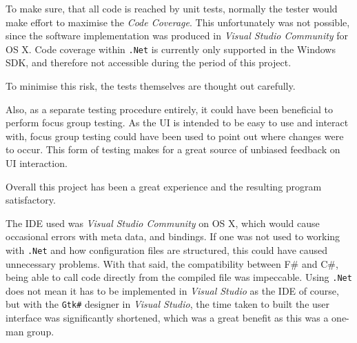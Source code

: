 To make sure, that all code is reached by unit tests, normally the tester would make effort to maximise the \textit{Code Coverage}. This unfortunately was not possible, since the software implementation was produced in \textit{Visual Studio Community} for OS X. Code coverage within \texttt{.Net} is currently only supported in the Windows SDK, and therefore not accessible during the period of this project. 

To minimise this risk, the tests themselves are thought out carefully.

\vspace{1cm}
Also, as a separate testing procedure entirely, it could have been beneficial to perform focus group testing. As the UI is intended to be easy to use and interact with, focus group testing could have been used to point out where changes were to occur. This form of testing makes for a great source of unbiased feedback on UI interaction.

\vspace{1 cm}
Overall this project has been a great experience and the resulting program satisfactory.

The IDE used was \textit{Visual Studio Community} on OS X, which would cause occasional errors with meta data, and bindings. If one was not used to working with \texttt{.Net} and how configuration files are structured, this could have caused unnecessary problems. With that said, the compatibility between F\# and C\#, being able to call code directly from the compiled file was impeccable. Using \texttt{.Net} does not mean it has to be implemented in \textit{Visual Studio} as the IDE of course, but with the \texttt{Gtk\#} designer in \textit{Visual Studio}, the time taken to built the user interface was significantly shortened, which was a great benefit as this was a one-man group.